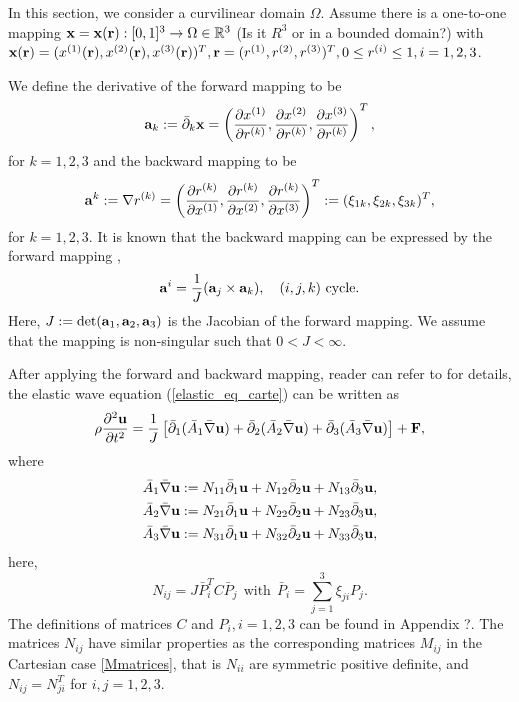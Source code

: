 \documentclass[a4paper]{article}
\begin{document}
In this section, we consider a curvilinear domain $\Omega$. Assume there is a one-to-one mapping ${\bf x} = {\bf x}({\bf r}) : [0,1]^3 \rightarrow \Omega \in \mathbb{R}^3$ {\color{red}(Is it $R^3$ or in a bounded domain?)} with ${\bf x}({\bf r}) = (x^{(1)}({\bf r}),x^{(2)}({\bf r}),x^{(3)}({\bf r}))^T, {\bf r} = (r^{(1)},r^{(2)},r^{(3)})^T, 0\leq r^{(i)}\leq1, i = 1,2,3$.

We define the derivative of the forward mapping to be 
\begin{equation}\label{elastic_eq_carte}
{\bf a}_k := \bar{\partial}_k{\bf x} = \left(\frac{\partial x^{(1)}}{\partial r^{(k)}},\frac{\partial x^{(2)}}{\partial r^{(k)}},\frac{\partial x^{(3)}}{\partial r^{(k)}}\right)^T,
\end{equation}
for $k = 1,2,3$ and the backward mapping to be
\begin{equation*}
{\bf a}^k := \nabla r^{(k)} = \left(\frac{\partial r^{(k)}}{\partial x^{(1)}},\frac{\partial r^{(k)}}{\partial x^{(2)}},\frac{\partial r^{(k)}}{\partial x^{(3)}}\right)^T := (\xi_{1k},\xi_{2k},\xi_{3k})^T,
\end{equation*}
for $k = 1,2,3$. It is known that the backward mapping can be expressed by the forward mapping \cite{?}, 
\begin{equation*}
{\bf a}^i = \frac{1}{J}({\bf a}_j\times{\bf a}_k), \ \ \ (i,j,k) \ \text{cycle}.
\end{equation*}
Here, $J:=\text{det}({\bf a}_1, {\bf a}_2, {\bf a}_3)$ is the Jacobian of the forward mapping. We assume that the mapping is non-singular such that  $0<J<\infty$.

After applying the forward and backward mapping, reader can refer to \cite{?} for details, the elastic wave equation (\ref{elastic_eq_carte}) can be written as
\begin{equation}\label{elastic_eq_curvi}
\rho\frac{\partial^2 {\bf u}}{\partial t^2} = \frac{1}{J}\left[\bar{\partial }_1(\bar{A}_1\bar{\nabla}{\bf u}) + \bar{\partial }_2(\bar{A}_2\bar{\nabla}{\bf u}) +\bar{\partial }_3(\bar{A}_3\bar{\nabla}{\bf u}) \right] + {\bf F},
\end{equation}
where
\begin{align*}
	\bar{A}_1\bar{\nabla}{\bf u} &:= N_{11}\bar{\partial}_1{\bf u} + N_{12}\bar{\partial}_2{\bf u} + N_{13}\bar{\partial}_3{\bf u}, \\
	\bar{A}_2\bar{\nabla}{\bf u} &:= N_{21}\bar{\partial}_1{\bf u} + N_{22}\bar{\partial}_2{\bf u} + N_{23}\bar{\partial}_3{\bf u}, \\
	\bar{A}_3\bar{\nabla}{\bf u} &:= N_{31}\bar{\partial}_1{\bf u} + N_{32}\bar{\partial}_2{\bf u} + N_{33}\bar{\partial}_3{\bf u},
\end{align*}
here, 
\begin{equation}\label{definition_Nij}
N_{ij} = J\bar{P}_i^TC\bar{P}_j \ \ \text{with} \ \ \bar{P}_i = \sum_{j=1}^3\xi_{ji}P_j.
\end{equation}
The definitions of matrices $C$ and $P_i, i = 1,2,3$ can be found in Appendix ?. The matrices $N_{ij}$ have similar properties as the corresponding matrices $M_{ij}$ in the Cartesian case \eqref{Mmatrices}, that is $N_{ii}$ are symmetric positive definite, and $N_{ij}=N_{ji}^T$ for $i,j=1,2,3$.
\end{document}
